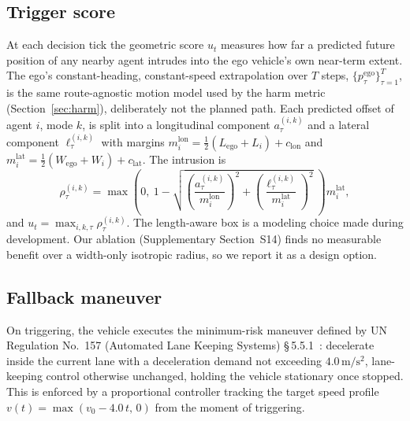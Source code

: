 \documentclass[lettersize,journal]{IEEEtran}
\begin{document}
\subsection{Trigger score}
\label{sec:trigger-score}
At each decision tick the geometric score $u_t$ measures how far a
predicted future position of any nearby agent intrudes into the ego
vehicle's own near-term extent. The ego's constant-heading,
constant-speed extrapolation over $T$ steps,
$\{p^{\mathrm{ego}}_\tau\}_{\tau=1}^{T}$, is the same route-agnostic motion
model used by the harm metric (Section~\ref{sec:harm}), deliberately not the
planned path. Each predicted offset of agent $i$, mode $k$, is split into a
longitudinal component $a^{(i,k)}_\tau$ and a lateral component
$\ell^{(i,k)}_\tau$ with margins
$m^{\mathrm{lon}}_i = \tfrac{1}{2}(L_{\mathrm{ego}}+L_i)+c_{\mathrm{lon}}$
and $m^{\mathrm{lat}}_i = \tfrac{1}{2}(W_{\mathrm{ego}}+W_i)+c_{\mathrm{lat}}$.
The intrusion is
\begin{equation}
\rho^{(i,k)}_\tau = \max\!\left(0,\ 1 - \sqrt{
\left(\frac{a^{(i,k)}_\tau}{m^{\mathrm{lon}}_i}\right)^{\!2} +
\left(\frac{\ell^{(i,k)}_\tau}{m^{\mathrm{lat}}_i}\right)^{\!2}}\;
\right) m^{\mathrm{lat}}_i,
\label{eq:score}
\end{equation}
and $u_t = \max_{i,k,\tau} \rho^{(i,k)}_\tau$. The length-aware box is a
modeling choice made during development. Our ablation
(Supplementary Section~S14) finds no measurable benefit over a width-only
isotropic radius, so we report it as a design option.

\subsection{Fallback maneuver}
\label{sec:mrm}
On triggering, the vehicle executes the minimum-risk maneuver defined
by UN Regulation No.~157 (Automated Lane Keeping Systems)
\S\,5.5.1~\cite{unr157}: decelerate inside the current lane with a
deceleration demand not exceeding $4.0\,\mathrm{m/s^2}$, lane-keeping
control otherwise unchanged, holding the vehicle stationary once
stopped. This is enforced by a proportional controller tracking the
target speed profile $v(t) = \max(v_0 - 4.0\,t,\,0)$ from the moment of
triggering.
\end{document}
